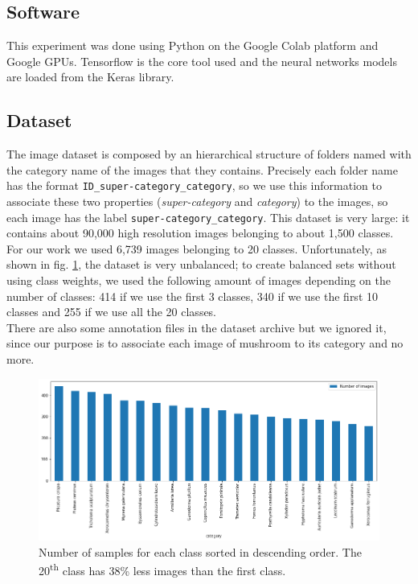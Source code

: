 \documentclass[12pt]{llncs}
\begin{document}
\subsection{Software}
This experiment was done using Python on the Google Colab platform \cite{colab} and Google GPUs. Tensorflow \cite{tensorflow} is the core tool used and the neural networks models are loaded from the Keras library.

\subsection{Dataset}
The image dataset is composed by an hierarchical structure of folders named with the category name of the images that they contains. Precisely each folder name has the format \texttt{ID\_super-category\_category}, so we use this information to associate these two properties (\textit{super-category} and \textit{category}) to the images, so each image has the label \texttt{super-category\_category}. This dataset is very large: it contains about 90,000 high resolution images belonging to about 1,500 classes. For our work we used 6,739 images belonging to 20 classes. Unfortunately, as shown in fig. \ref{fig:classes}, the dataset is very unbalanced; to create balanced sets without using class weights, we used the following amount of images depending on the number of classes: 414 if we use the first 3 classes, 340 if we use the first 10 classes and 255 if we use all the 20 classes.\\
There are also some annotation files in the dataset archive but we ignored it, since our purpose is to associate each image of mushroom to its category and no more.

\begin{figure}[h]
	\centering
	\includegraphics[width=\textwidth]{classes.png}
	\caption{Number of samples for each class sorted in descending order. The 20\textsuperscript{th} class has 38\% less images than the first class.}
	\label{fig:classes}
\end{figure}
\end{document}
